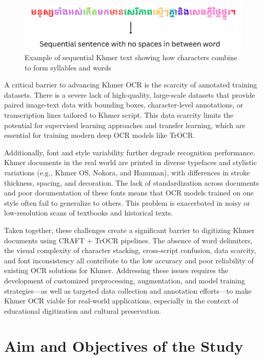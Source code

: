 \begin{figure}[ht]
    \centering
    \includegraphics[width=\textwidth]{figures/example_of_sequential_text.png}
    \caption{Example of sequential Khmer text showing how characters combine to form syllables and words}
    \label{fig:sequential_text}
\end{figure}


A critical barrier to advancing Khmer OCR is the scarcity of annotated training datasets. There is a severe lack of high-quality, large-scale datasets that provide paired image-text data with bounding boxes, character-level annotations, or transcription lines tailored to Khmer script. This data scarcity limits the potential for supervised learning approaches and transfer learning, which are essential for training modern deep OCR models like TrOCR.


Additionally, font and style variability further degrade recognition performance. Khmer documents in the real world are printed in diverse typefaces and stylistic variations (e.g., Khmer OS, Nokora, and Hanuman), with differences in stroke thickness, spacing, and decoration. The lack of standardization across documents and poor documentation of these fonts means that OCR models trained on one style often fail to generalize to others. This problem is exacerbated in noisy or low-resolution scans of textbooks and historical texts.

Taken together, these challenges create a significant barrier to digitizing Khmer documents using CRAFT + TrOCR pipelines. The absence of word delimiters, the visual complexity of character stacking, cross-script confusion, data scarcity, and font inconsistency all contribute to the low accuracy and poor reliability of existing OCR solutions for Khmer. Addressing these issues requires the development of customized preprocessing, augmentation, and model training strategies—as well as targeted data collection and annotation efforts—to make Khmer OCR viable for real-world applications, especially in the context of educational digitization and cultural preservation.


\section{Aim and Objectives of the Study}
\label{sec:objectives}

